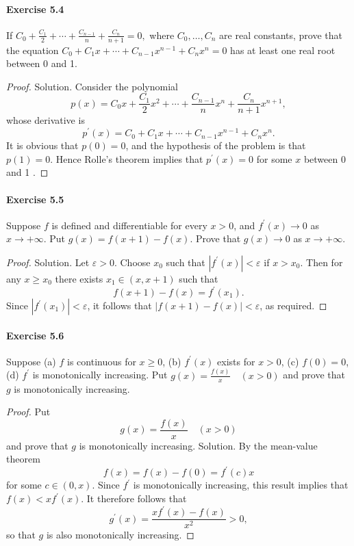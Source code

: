 \documentclass{article}
\theoremstyle{definition}
\begin{document}
\paragraph{Exercise 5.4} If $C_{0}+\frac{C_{1}}{2}+\cdots+\frac{C_{n-1}}{n}+\frac{C_{n}}{n+1}=0,$ where $C_{0}, \ldots, C_{n}$ are real constants, prove that the equation $C_{0}+C_{1} x+\cdots+C_{n-1} x^{n-1}+C_{n} x^{n}=0$ has at least one real root between 0 and 1.
\begin{proof}
    Solution. Consider the polynomial
$$
p(x)=C_0 x+\frac{C_1}{2} x^2+\cdots+\frac{C_{n-1}}{n} x^n+\frac{C_n}{n+1} x^{n+1},
$$
whose derivative is
$$
p^{\prime}(x)=C_0+C_1 x+\cdots+C_{n-1} x^{n-1}+C_n x^n .
$$
It is obvious that $p(0)=0$, and the hypothesis of the problem is that $p(1)=0$. Hence Rolle's theorem implies that $p^{\prime}(x)=0$ for some $x$ between 0 and 1 .
\end{proof}


\paragraph{Exercise 5.5} Suppose $f$ is defined and differentiable for every $x>0$, and $f^{\prime}(x) \rightarrow 0$ as $x \rightarrow+\infty$. Put $g(x)=f(x+1)-f(x)$. Prove that $g(x) \rightarrow 0$ as $x \rightarrow+\infty$.
\begin{proof}
    Solution. Let $\varepsilon>0$. Choose $x_0$ such that $\left|f^{\prime}(x)\right|<\varepsilon$ if $x>x_0$. Then for any $x \geq x_0$ there exists $x_1 \in(x, x+1)$ such that
$$
f(x+1)-f(x)=f^{\prime}\left(x_1\right) .
$$
Since $\left|f^{\prime}\left(x_1\right)\right|<\varepsilon$, it follows that $|f(x+1)-f(x)|<\varepsilon$, as required.
\end{proof}


\paragraph{Exercise 5.6} Suppose (a) $f$ is continuous for $x \geq 0$, (b) $f^{\prime}(x)$ exists for $x>0$, (c) $f(0)=0$, (d) $f^{\prime}$ is monotonically increasing. Put $g(x)=\frac{f(x)}{x} \quad(x>0)$ and prove that $g$ is monotonically increasing.
\begin{proof}
    Put
$$
g(x)=\frac{f(x)}{x} \quad(x>0)
$$
and prove that $g$ is monotonically increasing.
Solution. By the mean-value theorem
$$
f(x)=f(x)-f(0)=f^{\prime}(c) x
$$
for some $c \in(0, x)$. Since $f^{\prime}$ is monotonically increasing, this result implies that $f(x)<x f^{\prime}(x)$. It therefore follows that
$$
g^{\prime}(x)=\frac{x f^{\prime}(x)-f(x)}{x^2}>0,
$$
so that $g$ is also monotonically increasing.
\end{proof}
\end{document}
